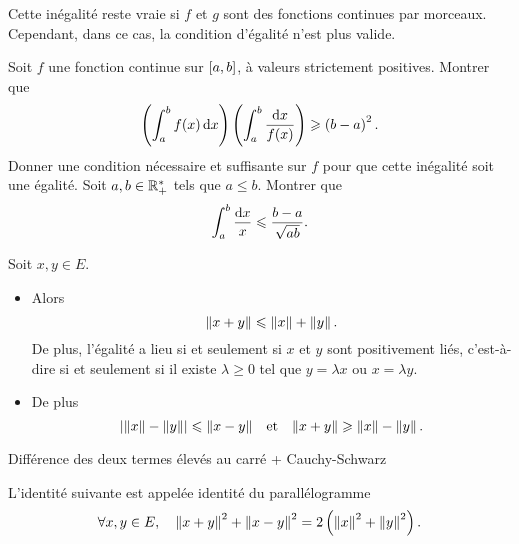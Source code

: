 \documentclass{magnolia}
\begin{document}
\begin{remarqueUnique}
\remarque Cette inégalité reste vraie si $f$ et $g$ sont des fonctions continues
  par morceaux. Cependant, dans ce cas, la condition d'égalité n'est plus valide.
\end{remarqueUnique}

\begin{exos}
\exo Soit $f$ une fonction continue sur $\interf{a}{b}$,
  à valeurs strictement positives. Montrer que
  \[\p{\integ{a}{b}{f(x)}{x}}\p{\integinv{a}{b}{f(x)}{x}}\geq\p{b-a}^2.\]
  Donner une condition nécessaire et suffisante sur $f$ pour que cette inégalité
  soit une égalité.
\exo Soit $a,b\in\RPs$ tels que $a\leq b$. Montrer que
  \[\integinv{a}{b}{x}{x}\leq \frac{b-a}{\sqrt{ab}}.\]
\end{exos}

\begin{proposition}[utile=3, nom=Inégalité triangulaire]
Soit $x,y\in E$.
\begin{itemize}
\item Alors
  \[\norme{x+y}\leq\norme{x}+\norme{y}.\]
  De plus, l'égalité a lieu si et seulement si $x$ et $y$ sont positivement
  liés, c'est-à-dire si et seulement si il existe $\lambda\geq 0$ tel que
  $y=\lambda x$ ou $x=\lambda y$.
\item De plus
  \[\abs{\norme{x}-\norme{y}}\leq\norme{x-y} \et
    \norme{x+y}\geq\norme{x}-\norme{y}.\]
\end{itemize}
\end{proposition}

\begin{preuve}
Différence des deux termes élevés au carré + Cauchy-Schwarz
\end{preuve}

\begin{proposition}[utile=2]
L'identité suivante est appelée identité du parallélogramme
\[\forall x,y\in E, \quad \norme{x+y}^2+\norme{x-y}^2=
  2\p{\norme{x}^2+\norme{y}^2}.\]
\end{proposition}
\end{document}
